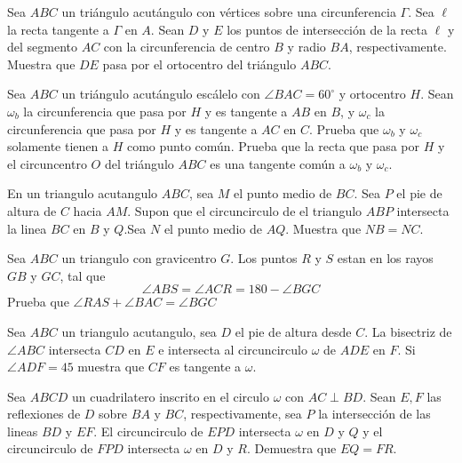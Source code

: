 \documentclass[11pt]{scrartcl}
\newcommand{\gad}{\textcolor{yellow}{$\bigstar$}}
\newcommand{\thmdifficulty}{0}
\newcommand{\problemdiff}[1]{\renewcommand{\thmdifficulty}{#1}}
\begin{document}
\problemdiff{3}
\begin{problema}[OMM 2011/2]    
    Sea $ABC$ un triángulo acutángulo con vértices sobre una circunferencia $\Gamma$. Sea $\ell$ la recta
tangente a $\Gamma$ en $A$. Sean $D$ y $E$ los puntos de intersección de la recta $\ell$ y del segmento $AC$ con la circunferencia de centro $B$ y radio $BA$, respectivamente. Muestra que $DE$ pasa por el ortocentro del triángulo $ABC$.
    
\end{problema}

\problemdiff{3}
\begin{problema}[OMM 2021/4]
    Sea $ABC$ un triángulo acutángulo escálelo con $\angle BAC=60^{\circ}$ y ortocentro $H$. Sean $\omega_b$ la circunferencia que pasa por $H$ y es tangente a $AB$ en $B$, y $\omega_c$ la circunferencia que pasa por $H$ y es tangente a $AC$ en $C$. Prueba que $\omega_b$ y $\omega_c$ solamente tienen a $H$ como punto común.  Prueba que la recta que pasa por $H$ y el circuncentro $O$ del triángulo $ABC$ es una tangente común a $\omega_b$ y $\omega_c$.
 
\end{problema}

\problemdiff{4}
\begin{problema}[USAMO 2023/1]
    En un triangulo acutangulo $ABC$, sea $M$ el punto medio de $BC$. Sea $P$ el pie de altura de $C$ hacia $AM$. Supon que el circuncirculo de el triangulo $ABP$ intersecta la linea $BC$ en $B$ y $Q$.Sea $N$ el punto medio de $AQ$. Muestra que $NB=NC$.
\end{problema}



\problemdiff{5}
\begin{problema} [USA TSTST 2023/1 \gad] %
    Sea $ABC$ un triangulo con gravicentro $G$. Los puntos $R$ y $S$ estan en los rayos $GB$ y $GC$, tal que 
    $$\angle ABS=\angle ACR=180-\angle BGC$$
    Prueba que $\angle RAS+\angle BAC=\angle BGC$
\end{problema}

\problemdiff{5}
\begin{problema}
    Sea $ABC$ un triangulo acutangulo, sea $D$ el pie de altura desde $C$. La bisectriz de $\angle ABC$ intersecta $CD$ en $E$ e intersecta al circuncirculo $\omega$ de $ADE$ en $F$. Si $\angle ADF=45$ muestra que $CF$ es tangente a $\omega$.
\end{problema}


\problemdiff{6}
\begin{problema} [USAJMO 2018/3]
  Sea $ABCD$ un cuadrilatero inscrito en el circulo $\omega$ con $AC \perp BD$. Sean $E,F$ las reflexiones de $D$ sobre $BA$ y $BC$, respectivamente, sea $P$ la intersecci\'on de las lineas $BD$ y $EF$. El circuncirculo de $EPD$ intersecta $\omega$ en $D$ y $Q$ y el circuncirculo de $FPD$ intersecta $\omega$ en $D$ y $R$. Demuestra que $EQ=FR$.
\end{problema}
\end{document}
